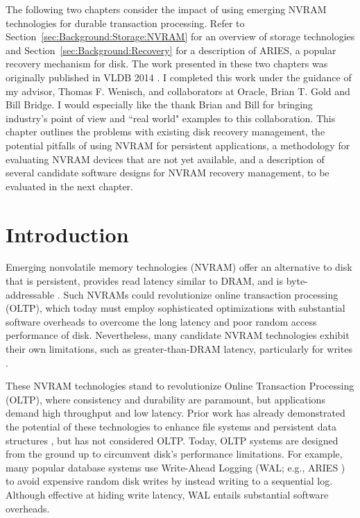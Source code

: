 The following two chapters consider the impact of using emerging NVRAM technologies for durable transaction processing.
Refer to Section~\ref{sec:Background:Storage:NVRAM} for an overview of storage technologies and Section~\ref{sec:Background:Recovery} for a description of ARIES, a popular recovery mechanism for disk.
The work presented in these two chapters was originally published in VLDB 2014 \cite{Pelley13}.
I completed this work under the guidance of my advisor, Thomas F. Wenisch, and collaborators at Oracle, Brian T. Gold and Bill Bridge.
I would especially like the thank Brian and Bill for bringing industry's point of view and ``real world" examples to this collaboration.
This chapter outlines the problems with existing disk recovery management, the potential pitfalls of using NVRAM for persistent applications, a methodology for evaluating NVRAM devices that are not yet available, and a description of several candidate software designs for NVRAM recovery management, to be evaluated in the next chapter.

\section{Introduction}
\label{sec:OLTP_design:Intro}

Emerging nonvolatile memory technologies (NVRAM) offer an alternative to disk that is persistent, provides read latency similar to DRAM, and is byte-addressable \cite{BurrKurdi08}.
Such NVRAMs could revolutionize online transaction processing (OLTP), which today must employ sophisticated optimizations with substantial software overheads to overcome the long latency and poor random access performance of disk.
Nevertheless, many candidate NVRAM technologies exhibit their own limitations, such as greater-than-DRAM latency, particularly for writes \cite{LeeIpek09}.

These NVRAM technologies stand to revolutionize Online Transaction Processing (OLTP), where consistency and durability are paramount, but applications demand high throughput and low latency.
Prior work has already demonstrated the potential of these technologies to enhance file systems \cite{ConditNightingale09} and persistent data structures \cite{VenkataramanTolia11}, but has not considered OLTP.
Today, OLTP systems are designed from the ground up to circumvent disk's performance limitations.
For example, many popular database systems use Write-Ahead Logging (WAL; e.g., ARIES \cite{MohanHaderle92}) to avoid expensive random disk writes by instead writing to a sequential log.  
Although effective at hiding write latency, WAL entails substantial software overheads.

